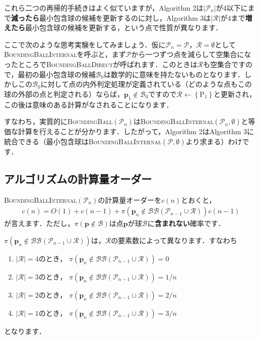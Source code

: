 ﻿\documentclass[a4paper]{jsarticle}
\begin{document}
これら二つの再帰的手続きはよく似ていますが，Algorithm 2は$|\mathcal{P}_{n}|$が4以下にまで{\bf 減ったら}最小包含球の候補を更新するのに対し，Algorithm 3は$|\mathcal{R}|$が4まで{\bf 増えたら}最小包含球の候補を更新する，という点で性質が異なります．

ここで次のような思考実験をしてみましょう．仮に$\mathcal{P}_{n}=\mathcal{P}$，$\mathcal{R}=\emptyset$として\textsc{BoundingBallInternal}を呼ぶと，まず$\mathcal{P}$から一つずつ点を減らして空集合になったところで\textsc{BoundingBallDirect}が呼ばれます．このときは$\mathcal{R}$も空集合ですので，最初の最小包含球の候補$\mathcal{B}_{0}$は数学的に意味を持たないものとなります．しかしこの$\mathcal{B}_{0}$に対して点の内外判定処理が定義されている（どのような点もこの球の外部の点と判定される）ならば，$\boldsymbol{p}_{1}\notin\mathcal{B}_{0}$ですので$\mathcal{R}\leftarrow\left\{\mathrm{P}_{1}\right\}$と更新され，この後は意味のある計算がなされることになります．

すなわち，実質的に\textsc{BoundingBall}$(\mathcal{P}_{n})$は\textsc{BoundingBallInternal}$(\mathcal{P}_{n},\emptyset)$と等価な計算を行えることが分かります．したがって，Algorithm 2はAlgorithm 3に統合できる（最小包含球は\textsc{BoundingBallInternal}$(\mathcal{P},\emptyset)$より求まる）わけです．

\subsection{アルゴリズムの計算量オーダー}

\textsc{BoundingBallInternal}$(\mathcal{P}_{n})$の計算量オーダーを$c(n)$とおくと，
\begin{align*}
c(n)=O(1)+c(n-1)+\pi(\boldsymbol{p}_{n}\notin\mathcal{BB}(\mathcal{P}_{n-1}\cup\mathcal{R}))c(n-1)
\end{align*}
が言えます．ただし，$\pi(\boldsymbol{p}\notin\mathcal{B})$は点$\boldsymbol{p}$が球$\mathcal{B}$に{\bf 含まれない}確率です．

$\pi(\boldsymbol{p}_{n}\notin\mathcal{BB}(\mathcal{P}_{n-1}\cup\mathcal{R}))$は，$\mathcal{R}$の要素数によって異なります．すなわち
\begin{enumerate}
\item{$\left|\mathcal{R}\right|=4$のとき，
$\pi(\boldsymbol{p}_{n}\notin\mathcal{BB}(\mathcal{P}_{n-1}\cup\mathcal{R}))=0$
}
\item{$\left|\mathcal{R}\right|=3$のとき，
$\pi(\boldsymbol{p}_{n}\notin\mathcal{BB}(\mathcal{P}_{n-1}\cup\mathcal{R}))=1/n$
}
\item{$\left|\mathcal{R}\right|=2$のとき，
$\pi(\boldsymbol{p}_{n}\notin\mathcal{BB}(\mathcal{P}_{n-1}\cup\mathcal{R}))=2/n$
}
\item{$\left|\mathcal{R}\right|=1$のとき，
$\pi(\boldsymbol{p}_{n}\notin\mathcal{BB}(\mathcal{P}_{n-1}\cup\mathcal{R}))=3/n$
}
\end{enumerate}
となります．
\end{document}
